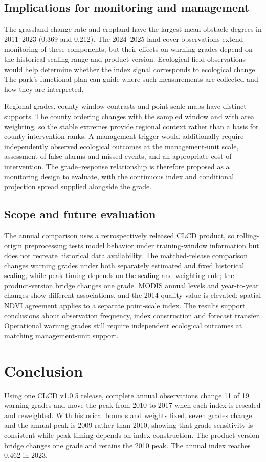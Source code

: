 \documentclass[preprint,11pt,authoryear]{elsarticle}
\begin{document}
\subsection{Implications for monitoring and management}
\label{sec:management}
The grassland change rate and cropland have the largest mean obstacle degrees in 2011--2023 (0.369 and 0.212). The 2024--2025 land-cover observations extend monitoring of these components, but their effects on warning grades depend on the historical scaling range and product version. Ecological field observations would help determine whether the index signal corresponds to ecological change. The park's functional plan can guide where such measurements are collected and how they are interpreted.

Regional grades, county-window contrasts and point-scale maps have distinct supports. The county ordering changes with the sampled window and with area weighting, so the stable extremes provide regional context rather than a basis for county intervention ranks. A management trigger would additionally require independently observed ecological outcomes at the management-unit scale, assessment of false alarms and missed events, and an appropriate cost of intervention. The grade--response relationship is therefore proposed as a monitoring design to evaluate, with the continuous index and conditional projection spread supplied alongside the grade.

\subsection{Scope and future evaluation}
The annual comparison uses a retrospectively released CLCD product, so rolling-origin preprocessing tests model behavior under training-window information but does not recreate historical data availability. The matched-release comparison changes warning grades under both separately estimated and fixed historical scaling, while peak timing depends on the scaling and weighting rule; the product-version bridge changes one grade. MODIS annual levels and year-to-year changes show different associations, and the 2014 quality value is elevated; spatial NDVI agreement applies to a separate point-scale index. The results support conclusions about observation frequency, index construction and forecast transfer. Operational warning grades still require independent ecological outcomes at matching management-unit support.

\section{Conclusion}
\label{sec:conclusion}
Using one CLCD v1.0.5 release, complete annual observations change 11 of 19 warning grades and move the peak from 2010 to 2017 when each index is rescaled and reweighted. With historical bounds and weights fixed, seven grades change and the annual peak is 2009 rather than 2010, showing that grade sensitivity is consistent while peak timing depends on index construction. The product-version bridge changes one grade and retains the 2010 peak. The annual index reaches 0.462 in 2023.
\end{document}
